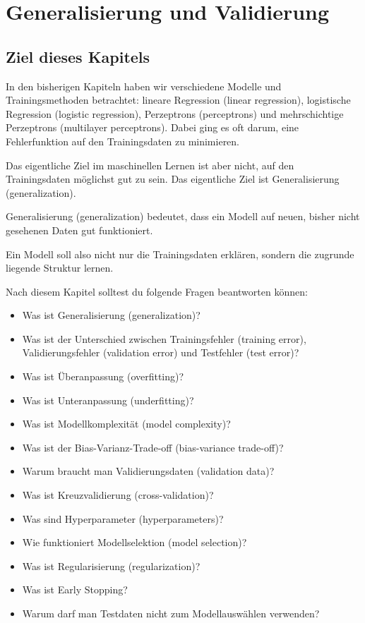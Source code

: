 \chapter{Generalisierung und Validierung}

\section{Ziel dieses Kapitels}

In den bisherigen Kapiteln haben wir verschiedene Modelle und Trainingsmethoden betrachtet:
lineare Regression (linear regression), logistische Regression (logistic regression), Perzeptrons (perceptrons) und mehrschichtige Perzeptrons (multilayer perceptrons).
Dabei ging es oft darum, eine Fehlerfunktion auf den Trainingsdaten zu minimieren.

Das eigentliche Ziel im maschinellen Lernen ist aber nicht, auf den Trainingsdaten möglichst gut zu sein.
Das eigentliche Ziel ist Generalisierung (generalization).

\begin{conceptbox}
Generalisierung (generalization) bedeutet, dass ein Modell auf neuen, bisher nicht gesehenen Daten gut funktioniert.

Ein Modell soll also nicht nur die Trainingsdaten erklären, sondern die zugrunde liegende Struktur lernen.
\end{conceptbox}

Nach diesem Kapitel solltest du folgende Fragen beantworten können:

\begin{itemize}
    \item Was ist Generalisierung (generalization)?
    \item Was ist der Unterschied zwischen Trainingsfehler (training error), Validierungsfehler (validation error) und Testfehler (test error)?
    \item Was ist Überanpassung (overfitting)?
    \item Was ist Unteranpassung (underfitting)?
    \item Was ist Modellkomplexität (model complexity)?
    \item Was ist der Bias-Varianz-Trade-off (bias-variance trade-off)?
    \item Warum braucht man Validierungsdaten (validation data)?
    \item Was ist Kreuzvalidierung (cross-validation)?
    \item Was sind Hyperparameter (hyperparameters)?
    \item Wie funktioniert Modellselektion (model selection)?
    \item Was ist Regularisierung (regularization)?
    \item Was ist Early Stopping?
    \item Warum darf man Testdaten nicht zum Modellauswählen verwenden?
\end{itemize}

